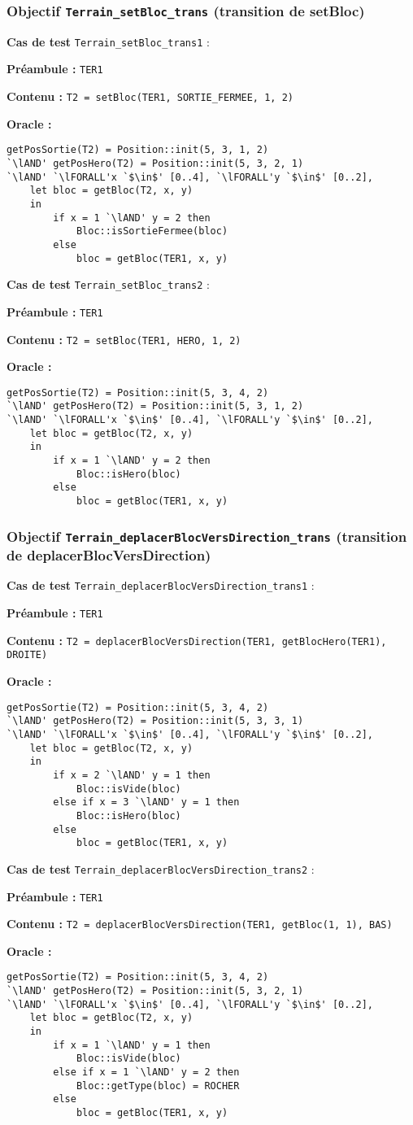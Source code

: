 \documentclass{article}
\newcommand{\cmd}[1]{\texttt{#1}}
\newcommand{\lAND}{$\land$}
\newcommand{\lFORALL}{$\forall$}
\newcommand{\obj}[2]{\subsubsection*{\large{\textbf{Objectif {\cmd{#1} (#2)}}}}}
\newenvironment{cas}[1]
{
	\hspace{1em}\textbf{Cas de test} \cmd{#1} :
	\begin{list}{}{}
}{
	\end{list}\vspace{1em}
}
\newcommand{\pre}[1]{\item \textbf{Préambule :} \cmd{#1}}
\newcommand{\ope}[1]{\item \textbf{Contenu :} \cmd{#1}}
\newcommand{\oram}{\item \textbf{Oracle :}}
\begin{document}
\obj{Terrain\_setBloc\_trans} {transition de setBloc}
	\begin{cas} {Terrain\_setBloc\_trans1}
		\pre{TER1}
		\ope{T2 = setBloc(TER1, SORTIE\_FERMEE, 1, 2)}
		\oram{}
		\begin{lstlisting}
getPosSortie(T2) = Position::init(5, 3, 1, 2)
`\lAND' getPosHero(T2) = Position::init(5, 3, 2, 1)
`\lAND' `\lFORALL'x `$\in$' [0..4], `\lFORALL'y `$\in$' [0..2],
	let bloc = getBloc(T2, x, y)
	in
		if x = 1 `\lAND' y = 2 then
			Bloc::isSortieFermee(bloc)
		else
			bloc = getBloc(TER1, x, y)
		\end{lstlisting}
	\end{cas}

	\begin{cas} {Terrain\_setBloc\_trans2}
		\pre{TER1}
		\ope{T2 = setBloc(TER1, HERO, 1, 2)}
		\oram{}
		\begin{lstlisting}
getPosSortie(T2) = Position::init(5, 3, 4, 2)
`\lAND' getPosHero(T2) = Position::init(5, 3, 1, 2)
`\lAND' `\lFORALL'x `$\in$' [0..4], `\lFORALL'y `$\in$' [0..2],
	let bloc = getBloc(T2, x, y)
	in
		if x = 1 `\lAND' y = 2 then
			Bloc::isHero(bloc)
		else
			bloc = getBloc(TER1, x, y)
		\end{lstlisting}
	\end{cas}

\obj{Terrain\_deplacerBlocVersDirection\_trans} {transition de deplacerBlocVersDirection}
	\begin{cas} {Terrain\_deplacerBlocVersDirection\_trans1}
		\pre{TER1}
		\ope{T2 = deplacerBlocVersDirection(TER1, getBlocHero(TER1), DROITE)}
		\oram{}
		\begin{lstlisting}
getPosSortie(T2) = Position::init(5, 3, 4, 2)
`\lAND' getPosHero(T2) = Position::init(5, 3, 3, 1)
`\lAND' `\lFORALL'x `$\in$' [0..4], `\lFORALL'y `$\in$' [0..2],
	let bloc = getBloc(T2, x, y)
	in
		if x = 2 `\lAND' y = 1 then
			Bloc::isVide(bloc)
		else if x = 3 `\lAND' y = 1 then
			Bloc::isHero(bloc)
		else
			bloc = getBloc(TER1, x, y)
		\end{lstlisting}
	\end{cas}

	\begin{cas} {Terrain\_deplacerBlocVersDirection\_trans2}
		\pre{TER1}
		\ope{T2 = deplacerBlocVersDirection(TER1, getBloc(1, 1), BAS)}
		\oram{}
		\begin{lstlisting}
getPosSortie(T2) = Position::init(5, 3, 4, 2)
`\lAND' getPosHero(T2) = Position::init(5, 3, 2, 1)
`\lAND' `\lFORALL'x `$\in$' [0..4], `\lFORALL'y `$\in$' [0..2],
	let bloc = getBloc(T2, x, y)
	in
		if x = 1 `\lAND' y = 1 then
			Bloc::isVide(bloc)
		else if x = 1 `\lAND' y = 2 then
			Bloc::getType(bloc) = ROCHER
		else
			bloc = getBloc(TER1, x, y)
		\end{lstlisting}
	\end{cas}
\end{document}
